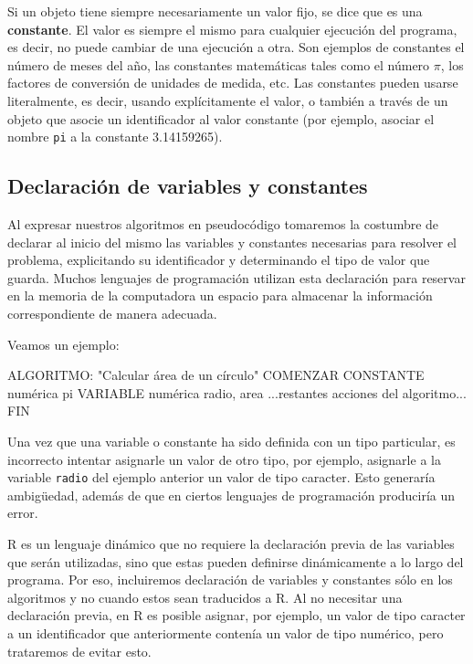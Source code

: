 \documentclass[
]{book}
\newenvironment{Shaded}{\begin{snugshade}}{\end{snugshade}}
\newcommand{\NormalTok}[1]{#1}
\begin{document}
Si un objeto tiene siempre necesariamente un valor fijo, se dice que es una \textbf{constante}. El valor es siempre el mismo para cualquier ejecución del programa, es decir, no puede cambiar de una ejecución a otra. Son ejemplos de constantes el número de meses del año, las constantes matemáticas tales como el número \(\pi\), los factores de conversión de unidades de medida, etc. Las constantes pueden usarse literalmente, es decir, usando explícitamente el valor, o también a través de un objeto que asocie un identificador al valor constante (por ejemplo, asociar el nombre \texttt{pi} a la constante 3.14159265).

\hypertarget{declaraciuxf3n-de-variables-y-constantes}{%
\subsection{Declaración de variables y constantes}\label{declaraciuxf3n-de-variables-y-constantes}}

Al expresar nuestros algoritmos en pseudocódigo tomaremos la costumbre de declarar al inicio del mismo las variables y constantes necesarias para resolver el problema, explicitando su identificador y determinando el tipo de valor que guarda. Muchos lenguajes de programación utilizan esta declaración para reservar en la memoria de la computadora un espacio para almacenar la información correspondiente de manera adecuada.

Veamos un ejemplo:

\begin{Shaded}
\begin{Highlighting}[]
\NormalTok{ALGORITMO: "Calcular área de un círculo"}
\NormalTok{COMENZAR}
\NormalTok{    CONSTANTE numérica pi}
\NormalTok{    VARIABLE numérica radio, area}
\NormalTok{        ...restantes acciones del algoritmo...}
\NormalTok{FIN}
\end{Highlighting}
\end{Shaded}

Una vez que una variable o constante ha sido definida con un tipo particular, es incorrecto intentar asignarle un valor de otro tipo, por ejemplo, asignarle a la variable \texttt{radio} del ejemplo anterior un valor de tipo caracter. Esto generaría ambigüedad, además de que en ciertos lenguajes de programación produciría un error.

R es un lenguaje dinámico que no requiere la declaración previa de las variables que serán utilizadas, sino que estas pueden definirse dinámicamente a lo largo del programa. Por eso, incluiremos declaración de variables y constantes sólo en los algoritmos y no cuando estos sean traducidos a R. Al no necesitar una declaración previa, en R es posible asignar, por ejemplo, un valor de tipo caracter a un identificador que anteriormente contenía un valor de tipo numérico, pero trataremos de evitar esto.
\end{document}
